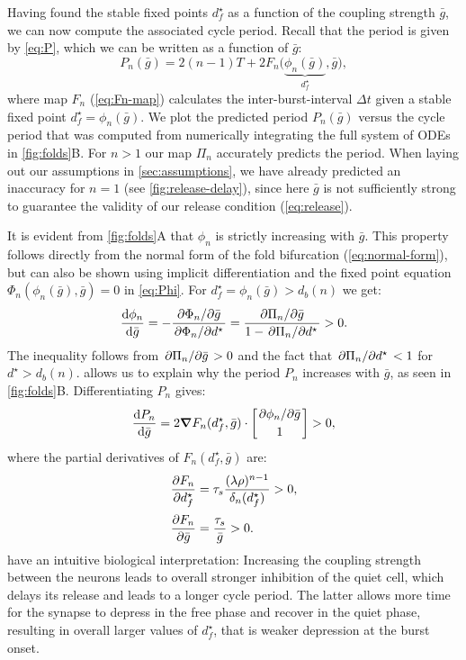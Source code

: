 \documentclass[utf8]{frontiersFPHY} %
\newcommand{\dstar}{d^\star}
\newcommand{\gbar}{\bar g}
\newcommand{\delt}{\Delta t}
\newcommand{\taus}{\tau_s}
\newcommand{\dn}{\delta_n}
\begin{document}
Having found the stable fixed points $\dstar_f$ as a function of the coupling strength $\gbar$, we can now compute the associated cycle period.
Recall that the period is given by \cref{eq:P}, which we can be written as a function of $\gbar$:
\begin{equation}
  \label{eq:period}
  P_n(\gbar) = 2(n-1)T + 2F_n\big(\underbrace{\phi_n(\gbar)}_{\dstar_f}, \gbar\big),
\end{equation}
where map $F_n$ (\cref{eq:Fn-map}) calculates the inter-burst-interval $\delt$ given a stable fixed point $\dstar_f=\phi_n(\gbar)$.
We plot the predicted period $P_n(\gbar)$ versus the cycle period that was computed from numerically integrating the full system of ODEs in \cref{fig:folds}B.
For $n>1$ our map $\Pi_n$ accurately predicts the period.
When laying out our assumptions in \cref{sec:assumptions}, we have already predicted an inaccuracy for $n=1$ (see \cref{fig:release-delay}), since here $\gbar$ is not sufficiently strong to guarantee the validity of our release condition (\cref{eq:release}).

It is evident from \cref{fig:folds}A that $\phi_n$ is strictly increasing with $\gbar$.
This property follows directly from the normal form of the fold bifurcation (\cref{eq:normal-form}), but can also be shown using implicit differentiation and the fixed point equation $\Phi_n(\phi_n(\gbar), \gbar)=0$ in \cref{eq:Phi}. For $\dstar_f=\phi_n(\gbar)>d_b(n)$ we get:
\begin{equation}
  \label{eq:dstardg}
  \dv{\phi_n}{\gbar} = -\frac{\pdv*{\Phi_n}{\gbar}}{\pdv*{\Phi_n}{\dstar}} =
  \frac{\pdv*{\Pi_n}{\gbar}}{1-\pdv*{\Pi_n}{\dstar}}>0.
\end{equation}
The inequality follows from $\pdv*{\Pi_n}{\gbar}>0$ and the fact that $\pdv*{\Pi_n}{\dstar}<1$ for $\dstar>d_b(n)$.
 allows us to explain why the period $P_n$ increases with $\gbar$, as seen in \cref{fig:folds}B.
Differentiating $P_n$ gives:
\begin{equation}
  \label{eq:dPdg}
  \dv{P_{n}}{\gbar} = 2\grad F_n(\dstar_f, \gbar) \cdot
                      \begin{bmatrix}\pdv*{\phi_n}{\gbar}\\[0.5ex] 1\end{bmatrix}>0,
\end{equation}
where the partial derivatives of $F_n(\dstar_f, \gbar)$ are:
\begin{align}
  \pdv{F_n}{\dstar_f} &= \taus \frac{(\lambda\rho)^{n-1}}{\dn(\dstar_f)}>0,\\[0.5ex]
  \pdv{F_n}{\gbar}  &= \frac{\taus}{\gbar}>0.
\end{align}
 have an intuitive biological interpretation:
Increasing the coupling strength between the neurons leads to overall stronger inhibition of the quiet cell, which delays its release and leads to a longer cycle period.
The latter allows more time for the synapse to depress in the free phase and recover in the quiet phase, resulting in overall larger values of $\dstar_f$, that is weaker depression at the burst onset.
\end{document}
